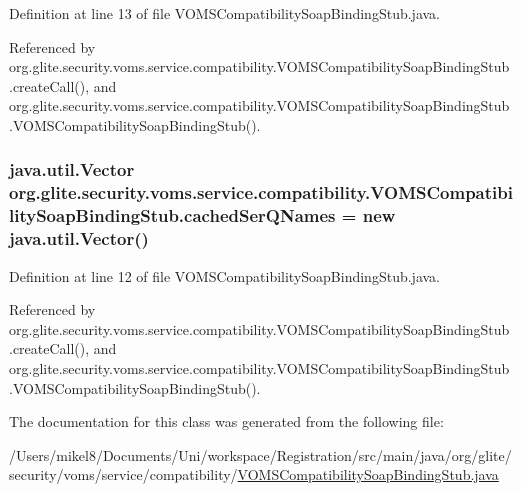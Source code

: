 Definition at line 13 of file VOMSCompatibilitySoapBindingStub.java.



Referenced by org.glite.security.voms.service.compatibility.VOMSCompatibilitySoapBindingStub.createCall(), and org.glite.security.voms.service.compatibility.VOMSCompatibilitySoapBindingStub.VOMSCompatibilitySoapBindingStub().

\hypertarget{classorg_1_1glite_1_1security_1_1voms_1_1service_1_1compatibility_1_1VOMSCompatibilitySoapBindingStub_a1f33ebefee9585df5d162a627af10f6d}{
\subsubsection[{cachedSerQNames}]{\setlength{\rightskip}{0pt plus 5cm}java.util.Vector {\bf org.glite.security.voms.service.compatibility.VOMSCompatibilitySoapBindingStub.cachedSerQNames} = new java.util.Vector()}}
\label{classorg_1_1glite_1_1security_1_1voms_1_1service_1_1compatibility_1_1VOMSCompatibilitySoapBindingStub_a1f33ebefee9585df5d162a627af10f6d}


Definition at line 12 of file VOMSCompatibilitySoapBindingStub.java.



Referenced by org.glite.security.voms.service.compatibility.VOMSCompatibilitySoapBindingStub.createCall(), and org.glite.security.voms.service.compatibility.VOMSCompatibilitySoapBindingStub.VOMSCompatibilitySoapBindingStub().



The documentation for this class was generated from the following file:\begin{DoxyCompactItemize}
\item 
/Users/mikel8/Documents/Uni/workspace/Registration/src/main/java/org/glite/security/voms/service/compatibility/\hyperlink{VOMSCompatibilitySoapBindingStub_8java}{VOMSCompatibilitySoapBindingStub.java}\end{DoxyCompactItemize}

